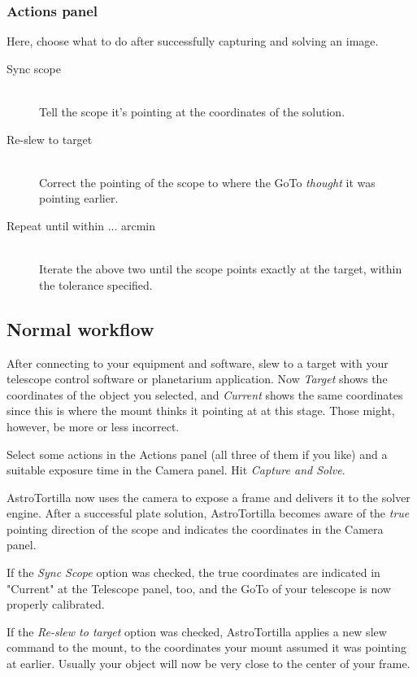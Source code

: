 \documentclass[english]{article}
\begin{document}
\subsubsection{Actions panel}

Here, choose what to do after successfully capturing and solving an image.
\begin{description}
\item[Sync scope] \hfill \\
Tell the scope it's pointing at the coordinates of the solution.
\item[Re-slew to target] \hfill \\
Correct the pointing of the scope to where the GoTo \emph{thought} it was pointing earlier.
\item[Repeat until within ... arcmin] \hfill \\
Iterate the above two until the scope points exactly at the target, within the tolerance specified.
\end{description}

\subsection{Normal workflow}

After connecting to your equipment and software, slew to a target with your telescope control software or planetarium application.
Now \emph{Target} shows the coordinates of the object you selected, and \emph{Current} shows the same coordinates since this is
where the mount thinks it pointing at at this stage. Those might, however, be more or less incorrect.

Select some actions in the Actions panel (all three of them if you like) and a suitable 
exposure time in the Camera panel. Hit \emph{Capture and Solve}.

AstroTortilla now uses the camera to expose a frame and delivers it to the solver engine. 
After a successful plate solution, AstroTortilla becomes aware of the \emph{true} 
pointing direction of the scope and indicates the coordinates in the Camera panel.

If the \emph{Sync Scope} option was checked, the true coordinates are indicated
in "Current" at the Telescope panel, too, and the GoTo of your telescope is now
properly calibrated.

If the \emph{Re-slew to target} option was checked, AstroTortilla applies a new
slew command to the mount, to the coordinates your mount assumed it was
pointing at earlier. Usually your object will now be very close to the center
of your frame.
\end{document}
